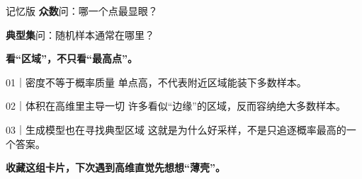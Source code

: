 \newpage
{}
\vspace{20bp}
\begin{XHSMintBox}{记忆版}
\textbf{众数}问：哪一个点最显眼？\par
\textbf{典型集}问：随机样本通常在哪里？
\end{XHSMintBox}
\vspace{18bp}
{\fontsize{38}{48}\selectfont\bfseries\color{XHSCoral}看“区域”，\newline 不只看“最高点”。\par}

\newpage
{}
\begin{XHSBox}{01｜密度不等于概率质量}
单点高，不代表附近区域能装下多数样本。
\end{XHSBox}
\begin{XHSMintBox}{02｜体积在高维里主导一切}
许多看似“边缘”的区域，反而容纳绝大多数样本。
\end{XHSMintBox}
\begin{XHSBox}{03｜生成模型也在寻找典型区域}
这就是为什么好采样，不是只追逐概率最高的一个答案。
\end{XHSBox}
\vfill
{\fontsize{31}{40}\selectfont\bfseries\color{XHSCoral}收藏这组卡片，\newline 下次遇到高维直觉先想想“薄壳”。\par}
